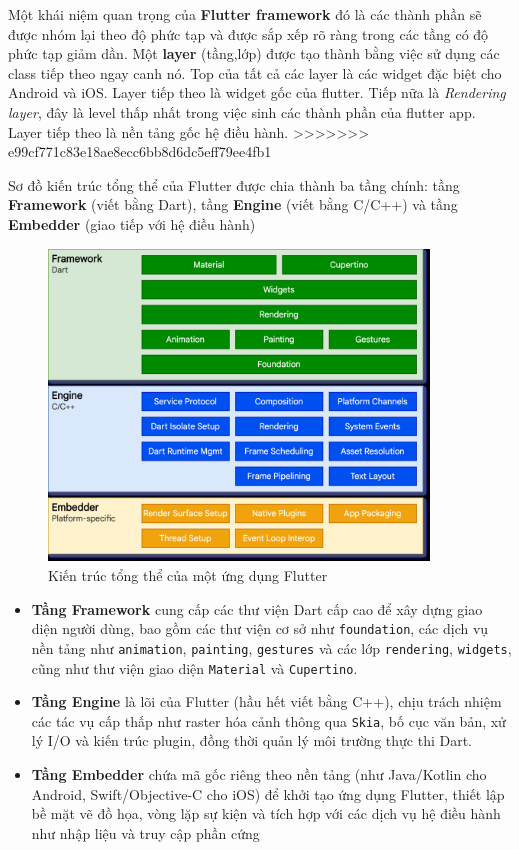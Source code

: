 \documentclass[../DoAn.tex]{subfiles}
\numberwithin{figure}{chapter}
\begin{document}
Một khái niệm quan trọng của \textbf{Flutter framework} đó là các thành phần sẽ được nhóm lại theo độ phức tạp và được sắp xếp rõ ràng trong các tầng có độ phức tạp giảm dần. Một \textbf{layer} (tầng,lớp) được tạo thành bằng việc sử dụng các class tiếp theo ngay canh nó. Top của tất cả các layer là các widget đặc biệt cho Android và iOS. Layer tiếp theo là widget gốc của flutter. Tiếp nữa là \textit{Rendering layer}, đây là level thấp nhất trong việc sinh các thành phần của flutter app. Layer tiếp theo là nền tảng gốc hệ điều hành.
>>>>>>> e99cf771c83e18ae8ecc6bb8d6dc5eff79ee4fb1

Sơ đồ kiến trúc tổng thể của Flutter được chia thành ba tầng chính: tầng \textbf{Framework} (viết bằng Dart), tầng \textbf{Engine} (viết bằng C/C++) và tầng \textbf{Embedder} (giao tiếp với hệ điều hành)

\begin{figure}[H]
    \centering
    \includegraphics[width=0.9\textwidth]{Hinhve/Chuong5/flutterArchitecture.png}
    \caption{Kiến trúc tổng thể của một ứng dụng Flutter}
    \label{fig:flutterarchitecture}
\end{figure}

\begin{itemize}
\item \textbf{Tầng Framework} cung cấp các thư viện Dart cấp cao để xây dựng giao diện người dùng, bao gồm các thư viện cơ sở như \texttt{foundation}, các dịch vụ nền tảng như \texttt{animation}, \texttt{painting}, \texttt{gestures} và các lớp \texttt{rendering}, \texttt{widgets}, cũng như thư viện giao diện \texttt{Material} và \texttt{Cupertino}.
\item \textbf{Tầng Engine} là lõi của Flutter (hầu hết viết bằng C++), chịu trách nhiệm các tác vụ cấp thấp như raster hóa cảnh thông qua \texttt{Skia}, bố cục văn bản, xử lý I/O và kiến trúc plugin, đồng thời quản lý môi trường thực thi Dart.
\item \textbf{Tầng Embedder} chứa mã gốc riêng theo nền tảng (như Java/Kotlin cho Android, Swift/Objective-C cho iOS) để khởi tạo ứng dụng Flutter, thiết lập bề mặt vẽ đồ họa, vòng lặp sự kiện và tích hợp với các dịch vụ hệ điều hành như nhập liệu và truy cập phần cứng
\end{itemize}
\end{document}
